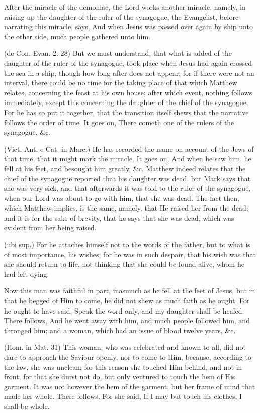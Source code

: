  After the miracle of the demoniac, the Lord works another miracle, namely, in raising up the daughter of the ruler of the synagogue; the Evangelist, before narrating this miracle, says, And when Jesus was passed over again by ship unto the other side, much people gathered unto him.

 (de Con. Evan. 2. 28) But we must understand, that what is added of the daughter of the ruler of the synagogue, took place when Jesus had again crossed the sea in a ship, though how long after does not appear; for if there were not an interval, there could be no time for the taking place of that which Matthew relates, concerning the feast at his own house; after which event, nothing follows immediately, except this concerning the daughter of the chief of the synagogue. For he has so put it together, that the transition itself shews that the narrative follows the order of time. It goes on, There cometh one of the rulers of the synagogue, \&c.

 (Vict. Ant. e Cat. in Marc.) He has recorded the name on account of the Jews of that time, that it might mark the miracle. It goes on, And when he saw him, he fell at his feet, and besought him greatly, \&c. Matthew indeed relates that the chief of the synagogue reported that his daughter was dead, but Mark says that she was very sick, and that afterwards it was told to the ruler of the synagogue, when our Lord was about to go with him, that she was dead. The fact then, which Matthew implies, is the same, namely, that He raised her from the dead; and it is for the sake of brevity, that he says that she was dead, which was evident from her being raised.

 (ubi sup.) For he attaches himself not to the words of the father, but to what is of most importance, his wishes; for he was in such despair, that his wish was that she should return to life, not thinking that she could be found alive, whom he had left dying.

 Now this man was faithful in part, inasmuch as he fell at the feet of Jesus, but in that he begged of Him to come, he did not shew as much faith as he ought. For he ought to have said, Speak the word only, and my daughter shall be healed. There follows, And he went away with him, and much people followed him, and thronged him; and a woman, which had an issue of blood twelve years, \&c.

 (Hom. in Mat. 31) This woman, who was celebrated and known to all, did not dare to approach the Saviour openly, nor to come to Him, because, according to the law, she was unclean; for this reason she touched Him behind, and not in front, for that she durst not do, but only ventured to touch the hem of His garment. It was not however the hem of the garment, but her frame of mind that made her whole. There follows, For she said, If I may but touch his clothes, I shall be whole.

